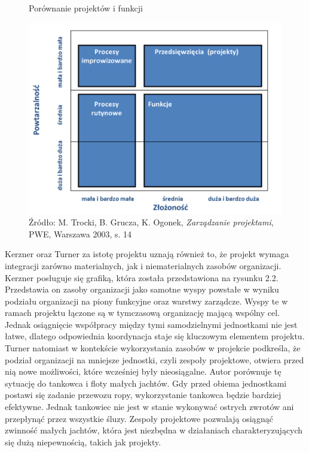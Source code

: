 \begin{figure}
\centering
\caption{Porównanie projektów i funkcji}
\includegraphics[width=14cm]{img/projekt.png}
\caption*{Źródło: M. Trocki, B. Grucza, K. Ogonek, \textit{Zarządzanie projektami}, PWE, Warszawa 2003, s. 14}
\end{figure}
Kerzner \autocite{Kerzner2017} oraz Turner \autocite{Turner2016} za istotę projektu uznają również to, że projekt wymaga integracji zarówno materialnych, jak i niematerialnych zasobów organizacji. Kerzner posługuje się grafiką, która została przedstawiona na rysunku 2.2. Przedstawia on zasoby organizacji jako samotne wyspy powstałe w wyniku podziału organizacji na piony funkcyjne oraz warstwy zarządcze. Wyspy te w ramach projektu łączone są w tymczasową organizację mającą wspólny cel. Jednak osiągnięcie współpracy między tymi samodzielnymi jednostkami nie jest łatwe, dlatego odpowiednia koordynacja staje się kluczowym elementem projektu. Turner natomiast w kontekście wykorzystania zasobów w projekcie podkreśla, że podział organizacji na mniejsze jednostki, czyli zespoły projektowe, otwiera przed nią nowe możliwości, które wcześniej były nieosiągalne. Autor porównuje tę sytuację do tankowca i floty małych jachtów. Gdy przed obiema jednostkami postawi się zadanie przewozu ropy, wykorzystanie tankowca będzie bardziej efektywne. Jednak tankowiec nie jest w stanie wykonywać ostrych zwrotów ani przepłynąć przez wszystkie śluzy. Zespoły projektowe pozwalają osiągnąć zwinność małych jachtów, która jest niezbędna w działaniach charakteryzujących się dużą niepewnością, takich jak projekty.
